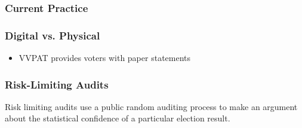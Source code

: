 \subsubsection{Current Practice}
\subsubsection{Digital vs. Physical}
\begin{itemize}
\item VVPAT provides voters with paper statements
\end{itemize}
\subsubsection{Risk-Limiting Audits}
Risk limiting audits use a public random auditing process to make an argument about the statistical confidence of a particular election result.
